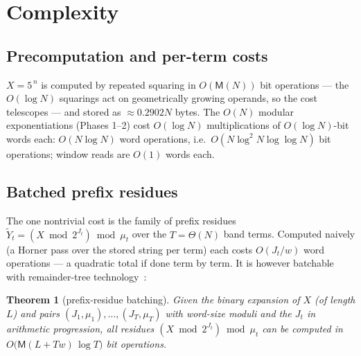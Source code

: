 \documentclass[11pt]{article}
\newtheorem{theorem}{Theorem}
\theoremstyle{remark}
\theoremstyle{definition}
\newcommand{\M}{\mathsf{M}}
\begin{document}
\section{Complexity}\label{sec:complexity}

\subsection{Precomputation and per-term costs}

$X=5^{\,n}$ is computed by repeated squaring in $O(\M(N))$ bit operations
--- the $O(\log N)$ squarings act on geometrically growing operands, so the
cost telescopes --- and stored as $\approx 0.2902N$ bytes. The $O(N)$ modular
exponentiations (Phases 1--2) cost $O(\log N)$ multiplications of
$O(\log N)$-bit words each: $O(N\log N)$ word operations, i.e.\
$O(N\log^{2}N\log\log N)$ bit operations; window reads are $O(1)$ words
each.

\subsection{Batched prefix residues}\label{sec:batch}

The one nontrivial cost is the family of prefix residues
$\widetilde{Y}_t=(X\bmod 2^{J_t})\bmod\mu_t$ over the $T=\Theta(N)$ band
terms. Computed naively (a Horner pass over the stored string per term) each
costs $O(J_t/w)$ word operations --- a quadratic total if done term by
term. It is however batchable
with remainder-tree technology~\cite{BorodinMoenck74,Bernstein04}:

\begin{theorem}[prefix-residue batching]\label{thm:batch}
Given the binary expansion of $X$ (of length $L$) and pairs
$(J_1,\mu_1),\dots,(J_T,\mu_T)$ with word-size moduli and the $J_t$ in
arithmetic progression, all residues $(X\bmod 2^{J_t})\bmod \mu_t$ can be
computed in $O\bigl(\M(L+Tw)\,\log T\bigr)$ bit operations.
\end{theorem}
\end{document}
